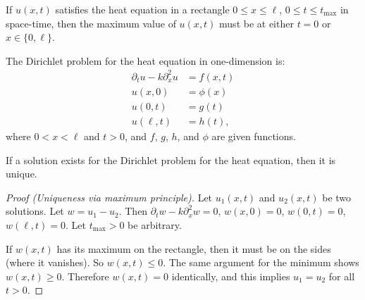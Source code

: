 \begin{node}\label{pde:heat-0006}%

\begin{theorem}\label{pde:heat-0003}%
If $u(x,t)$ satisfies the heat equation in a rectangle $0\leq x\leq\ell$,
$0\leq t\leq t_{\text{max}}$ in space-time,  then the maximum value of
$u(x,t)$ must be at either $t=0$ or $x\in\{0,\ell\}$.
\end{theorem}

\begin{node}\label{pde:heat-0004}%
The Dirichlet problem for the heat equation in one-dimension is:
\begin{equation}
\begin{split}
\partial_{t}u - k\partial_{x}^{2}u &=f(x,t)\\
u(x,0) &= \phi(x)\\
u(0,t)&=g(t)\\
u(\ell,t) &= h(t),
\end{split}
\end{equation}
where $0<x<\ell$ and $t>0$, and $f$, $g$, $h$, and $\phi$ are given
functions.

\begin{theorem}[Uniqueness]\label{pde:heat-0005}%
If a solution exists for the Dirichlet problem for the heat equation,
then it is unique.
\end{theorem}

\begin{proof}[Proof (Uniqueness via maximum principle)]
Let $u_{1}(x,t)$ and $u_{2}(x,t)$ be two solutions. Let $w=u_{1}-u_{2}$.
Then $\partial_{t}w-k\partial_{x}^{2}w=0$, $w(x,0)=0$, $w(0,t)=0$,
$w(\ell,t)=0$. Let $t_{\text{max}}>0$ be arbitrary.

If $w(x,t)$ has its maximum on the rectangle, then it must be on the
sides (where it vanishes). So $w(x,t)\leq0$. The same argument for the
minimum shows $w(x,t)\geq0$. Therefore $w(x,t)=0$ identically, and this
implies $u_{1}=u_{2}$ for all $t>0$.
\end{proof}


\end{node}
\end{node}
